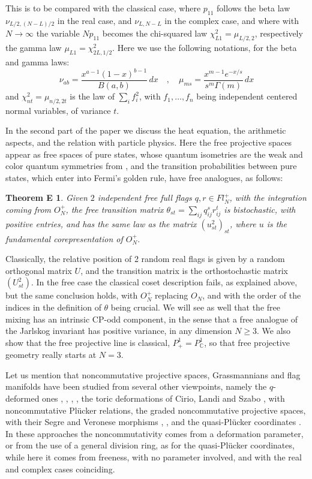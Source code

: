 \documentclass[11pt]{article}
\theoremstyle{plain}
\newtheorem*{theoremE}{Theorem E}
\begin{document}
This is to be compared with the classical case, where $p_{11}$ follows the beta law $\nu_{L/2,(N-L)/2}$ in the real case, and $\nu_{L,N-L}$ in the complex case, and where with $N\to\infty$ the variable $Np_{11}$ becomes the chi-squared law $\chi^2_{L1}=\mu_{L/2,2}$, respectively the gamma law $\mu_{L1}=\chi^2_{2L,1/2}$. Here we use the following notations, for the beta and gamma laws:
$$\nu_{ab}=\frac{x^{a-1}(1-x)^{b-1}}{B(a,b)}\,dx\quad,\quad
\mu_{ms}=\frac{x^{m-1}e^{-x/s}}{s^m\Gamma(m)}\,dx$$
and $\chi^2_{nt}=\mu_{n/2,2t}$ is the law of $\sum_if_i^2$, with $f_1,\ldots,f_n$ being independent centered normal variables, of variance $t$.

\bigskip

In the second part of the paper we discuss the heat equation, the arithmetic aspects, and the relation with particle physics. Here the free projective spaces appear as free spaces of pure states, whose quantum isometries are the weak and color quantum symmetries from \cite{bop}, and the transition probabilities between pure states, which enter into Fermi's golden rule, have free analogues, as follows:

\begin{theoremE}
Given $2$ independent free full flags $q,r\in Fl^+_N$, with the integration coming from $O_N^+$, the free transition matrix $\theta_{st}=\sum_{ij}q^s_{ij}r^t_{ij}$ is bistochastic, with positive entries, and has the same law as the matrix $(u_{st}^2)_{st}$, where $u$ is the fundamental corepresentation of $O_N^+$.
\end{theoremE}

Classically, the relative position of 2 random real flags is given by a random orthogonal matrix $U$, and the transition matrix is the orthostochastic matrix $(U_{st}^2)$. In the free case the classical coset description fails, as explained above, but the same conclusion holds, with $O_N^+$ replacing $O_N$, and with the order of the indices in the definition of $\theta$ being crucial. We will see as well that the free mixing has an intrinsic CP-odd component, in the sense that a free analogue of the Jarlskog invariant has positive variance, in any dimension $N\geq3$. We also show that the free projective line is classical, $P^1_+=P^1_\mathbb C$, so that free projective geometry really starts at $N=3$.

\bigskip

Let us mention that noncommutative projective spaces, Grassmannians and flag manifolds have been studied from several other viewpoints, namely the $q$-deformed ones \cite{ddl}, \cite{dst}, \cite{fio}, \cite{hsz}, the toric deformations of Cirio, Landi and Szabo \cite{cls}, with noncommutative Pl\"ucker relations, the graded noncommutative projective spaces, with their Segre and Veronese morphisms \cite{ags}, \cite{bch}, and the quasi-Pl\"ucker coordinates \cite{lau}. In these approaches the noncommutativity comes from a deformation parameter, or from the use of a general division ring, as for the quasi-Pl\"ucker coordinates, while here it comes from freeness, with no parameter involved, and with the real and complex cases coinciding.
\end{document}
